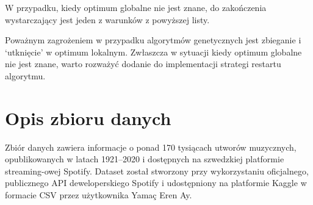 \documentclass[a4paper,11pt]{article}
\begin{document}
    \bigskip

    W przypadku, kiedy optimum globalne nie jest znane, do zakończenia wystarczający jest jeden z warunków z powyższej listy\cite{IntroductionToEvolutionaryComputing2015}.

    \bigskip

    Poważnym zagrożeniem w przypadku algorytmów genetycznych jest zbieganie i `utknięcie' w optimum lokalnym. Zwłaszcza w sytuacji kiedy optimum globalne nie jest znane, warto rozważyć dodanie do implementacji strategi restartu algorytmu\cite{GeneticAlgorithmEssentials2017}.

    \newpage


    \section{Opis zbioru danych}

    Zbiór danych zawiera informacje o ponad 170 tysiącach utworów muzycznych, opublikowanych w latach 1921--2020 i dostępnych na szwedzkiej platformie streaming-owej Spotify. Dataset został stworzony przy wykorzystaniu oficjalnego, publicznego API deweloperskiego Spotify i udostępniony na platformie Kaggle w formacie CSV przez użytkownika Yamaç Eren Ay\cite{SpotifyKaggleDataset2020}.

    \bigskip
\end{document}
